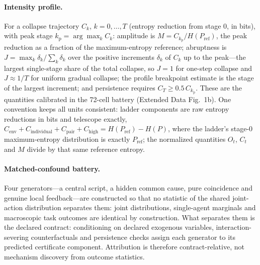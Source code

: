 \documentclass[11pt]{article}
\begin{document}
\paragraph{Intensity profile.}
For a collapse trajectory $C_k$, $k=0,\dots,T$ (entropy reduction from
stage 0, in bits), with peak stage $k_{\mathrm{p}}=\arg\max_k C_k$:
amplitude is $M=C_{k_{\mathrm{p}}}/H(P_\mathrm{ref})$, the peak
reduction as a fraction of the maximum-entropy reference; abruptness is
$J=\max_k \delta_k / \sum_k \delta_k$ over the positive increments
$\delta_k$ of $C_k$ up to the peak---the largest single-stage share of
the total collapse, so $J=1$ for one-step collapse and
$J\approx 1/T$ for uniform gradual collapse; the profile breakpoint
estimate is the stage of the largest increment; and persistence
requires $C_T\geq 0.5\,C_{k_{\mathrm{p}}}$. These are the quantities
calibrated in the 72-cell battery (Extended Data Fig.~1b). One
convention keeps all units consistent: ladder components are raw
entropy reductions in bits and telescope exactly,
$C_\mathrm{env}+C_\mathrm{individual}+C_\mathrm{pair}+C_\mathrm{high}
= H(P_\mathrm{ref})-H(P)$, where the ladder's stage-0 maximum-entropy
distribution is exactly $P_\mathrm{ref}$; the normalized quantities
$O_t$, $C_t$ and $M$ divide by that same reference entropy.

\paragraph{Matched-confound battery.}
Four generators---a central script, a hidden common cause, pure
coincidence and genuine local feedback---are constructed so that no
statistic of the shared joint-action distribution separates them:
joint distributions, single-agent marginals and macroscopic task
outcomes are identical by construction. What separates them is the
declared contract: conditioning on declared exogenous variables,
interaction-severing counterfactuals and persistence checks assign
each generator to its predicted certificate component. Attribution is
therefore contract-relative, not mechanism discovery from outcome
statistics.
\end{document}
